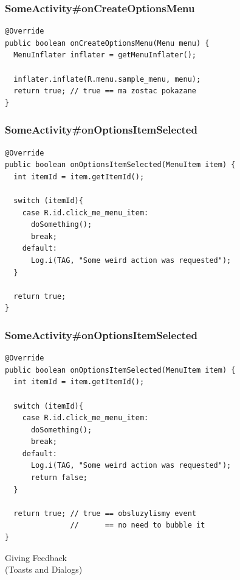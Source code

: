 \begin{frame}[fragile]\frametitle{SomeActivity\#onCreateOptionsMenu}
\begin{lstlisting}
@Override
public boolean onCreateOptionsMenu(Menu menu) { 
  MenuInflater inflater = getMenuInflater();

  inflater.inflate(R.menu.sample_menu, menu);
  return true; // true == ma zostac pokazane
}
\end{lstlisting}
\end{frame}

\begin{frame}[fragile]\frametitle{SomeActivity\#onOptionsItemSelected}
\begin{lstlisting}
@Override
public boolean onOptionsItemSelected(MenuItem item) {
  int itemId = item.getItemId();

  switch (itemId){
    case R.id.click_me_menu_item:
      doSomething();
      break;
    default:
      Log.i(TAG, "Some weird action was requested");
  }

  return true; 
}
\end{lstlisting}
\end{frame}

\begin{frame}[fragile]\frametitle{SomeActivity\#onOptionsItemSelected}
\begin{lstlisting}
@Override
public boolean onOptionsItemSelected(MenuItem item) {
  int itemId = item.getItemId();

  switch (itemId){
    case R.id.click_me_menu_item:
      doSomething();
      break;
    default:
      Log.i(TAG, "Some weird action was requested");
      return false;
  }

  return true; // true == obsluzylismy event
               //      == no need to bubble it
}
\end{lstlisting}
\end{frame}


\begin{frame}
\begin{center}
 \Huge{Giving Feedback} \\
 \large{(Toasts and Dialogs)}
\end{center}
\end{frame}


